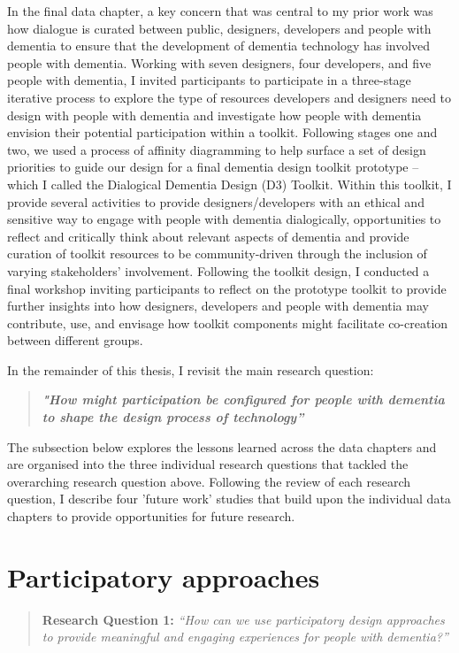 In the final data chapter, a key concern that was central to my prior work was how dialogue is curated between public, designers, developers and people with dementia to ensure that the development of dementia technology has involved people with dementia. Working with seven designers, four developers, and five people with dementia, I invited participants to participate in a three-stage iterative process to explore the type of resources developers and designers need to design with people with dementia and investigate how people with dementia envision their potential participation within a toolkit. Following stages one and two, we used a process of affinity diagramming to help surface a set of design priorities to guide our design for a final dementia design toolkit prototype – which I called the Dialogical Dementia Design (D3) Toolkit. Within this toolkit, I provide several activities to provide designers/developers with an ethical and sensitive way to engage with people with dementia dialogically, opportunities to reflect and critically think about relevant aspects of dementia and provide curation of toolkit resources to be community-driven through the inclusion of varying stakeholders' involvement. Following the toolkit design, I conducted a final workshop inviting participants to reflect on the prototype toolkit to provide further insights into how designers, developers and people with dementia may contribute, use, and envisage how toolkit components might facilitate co-creation between different groups. 

In the remainder of this thesis, I revisit the main research question:
\begin{quote}
\textbf{\textit{"How might participation be configured for people with dementia to shape the design process of technology”}}
\end{quote}
The subsection below explores the lessons learned across the data chapters and are organised into the three individual research questions that tackled the overarching research question above. Following the review of each research question, I describe four 'future work' studies that build upon the individual data chapters to provide opportunities for future research.
\section{Participatory approaches}
\label{Discussion:RQ1}
\begin{quote}
\textbf{    Research Question 1:
}    
\textit{    “How can we use participatory design approaches to provide meaningful and engaging experiences for people with dementia?”}
\end{quote}

